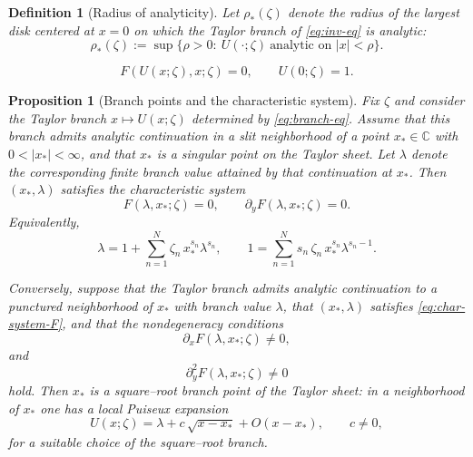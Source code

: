 \documentclass[10pt,a4paper]{amsart}
\newtheorem{definition}{Definition}
\newtheorem{proposition}{Proposition}
\newcommand{\CC}{\mathbb{C}}
\begin{document}
\begin{definition}[Radius of analyticity]\label{def:rho-star}
	Let $\rho_*(\zeta)$ denote the radius of the largest disk centered at $x=0$ on which the Taylor
	branch of \eqref{eq:inv-eq} is analytic:
	\begin{equation}\label{eq:rho-star}
		\rho_*(\zeta):=\sup\{\rho>0:\ U(\cdot;\zeta)\ \text{analytic on }|x|<\rho\}.
	\end{equation}
\end{definition}

\begin{equation}\label{eq:branch-eq}
	F(U(x;\zeta),x;\zeta)=0,
	\qquad
	U(0;\zeta)=1.
\end{equation}

\begin{proposition}[Branch points and the characteristic system]\label{prop:xi-star-system}
	Fix $\zeta$ and consider the Taylor branch $x\mapsto U(x;\zeta)$ determined by \eqref{eq:branch-eq}.
	Assume that this branch admits analytic continuation in a slit neighborhood of a point $x_*\in\CC$
	with $0<|x_*|<\infty$, and that $x_*$ is a singular point on the Taylor sheet. Let $\lambda$ denote
	the corresponding finite branch value attained by that continuation at $x_*$. Then $(x_*,\lambda)$
	satisfies the \emph{characteristic system}
	\begin{equation}\label{eq:char-system-F}
		F(\lambda,x_*;\zeta)=0,
		\qquad
		\partial_yF(\lambda,x_*;\zeta)=0.
	\end{equation}
	Equivalently,
	\begin{equation}\label{eq:char-system}
		\lambda
		=
		1+\sum_{n=1}^N \zeta_n\,x_*^{s_n} \lambda^{s_n},
		\qquad
		1
		=
		\sum_{n=1}^N s_n\,\zeta_n\,x_*^{s_n} \lambda^{s_n-1}.
	\end{equation}

	Conversely, suppose that the Taylor branch admits analytic continuation to a
	punctured neighborhood of $x_*$ with branch value $\lambda$, that
	$(x_*,\lambda)$ satisfies \eqref{eq:char-system-F}, and that the
	nondegeneracy conditions
	\begin{equation}\label{eq:Fx-nondeg}
		\partial_xF(\lambda,x_*;\zeta)\neq0,
	\end{equation}
	and
	\begin{equation}\label{eq:Fyy-nondeg}
		\partial_y^2F(\lambda,x_*;\zeta)\neq0
	\end{equation}
	hold. Then $x_*$ is a square--root branch point of the Taylor sheet: in a neighborhood of $x_*$ one has a
	local Puiseux expansion
	\[
		U(x;\zeta)=\lambda + c\,\sqrt{x-x_*}+O(x-x_*),
		\qquad c\neq0,
	\]
	for a suitable choice of the square--root branch.
\end{proposition}
\end{document}
